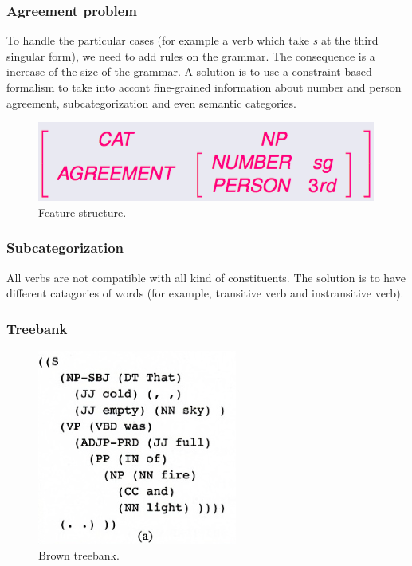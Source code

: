 \subsubsection{Agreement problem}

To handle the particular cases (for example a verb which take \textit{s} at the third singular form), we need to add rules on the grammar. The consequence is a increase of the size of the grammar. A solution is to use a constraint-based formalism to take into accont fine-grained information about number and person agreement, subcategorization and even semantic categories.

\begin{figure}[htp]
	\centering
	\includegraphics[scale=0.4]{images/41_matrix.png}
 	\caption{Feature structure.}
\end{figure}

\subsubsection{Subcategorization}

All verbs are not compatible with all kind of constituents. The solution is to have different catagories of words (for example, transitive verb and instransitive verb).

\subsubsection{Treebank}

\begin{figure}[htp]
	\centering
	\includegraphics[scale=0.4]{images/42_treebank.png}
 	\caption{Brown treebank.}
\end{figure}

